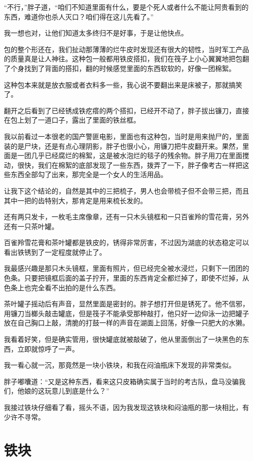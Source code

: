 “不行，”胖子道，“咱们不知道里面有什么，要是个死人或者什么不能让阿贵看到的东西，难道你也杀人灭口？咱们得在这儿先看了。”

我一想也对，让他们知道太多终归不是好事，于是让他快点。

包的整个形还在，我们扯动那薄薄的烂牛皮时发现还有很大的韧性，当时军工产品的质量真是让人神往。这种包一般都用铁皮搭扣，我们在筏子上小心翼翼地把包翻了个身找到了背面的搭扣，翻的时候感觉里面的东西软软的，好像一团棉絮。

这种包本来就是放衣服或者衣料多一些，我心说不要翻出来是床被子，那就搞笑了。

翻开之后看到了已经锈成铁疙瘩的两个搭扣，已经开不动了，胖子拔出镰刀，直接在包上划了一道口子，露出了里面的铁丝框。

我以前看过一本很老的国产警匪电影，里面也有这种包，当时是用来抛尸的，里面装的是尸块，还是有点心理阴影，胖子也很小心，用镰刀把牛皮翻开来。果然，里面是一团几乎已经腐烂的棉絮，这是被水泡烂的毯子的残余物。胖子用刀在里面搅动，很快，我们在棉絮的底部发现了一些东西，拨弄了一下，胖子像考古一样把这些东西全部勾了出来，那完全是一个女人的生活用品。

让我下这个结论的，自然是其中的三把梳子，男人也会带梳子但不会带三把，而且其中一把的齿特别大，那肯定是用来梳长发的。

还有两只发卡，一枚毛主席像章，还有一只木头镜框和一只百雀羚的雪花膏，另外还有一只茶叶罐。

百雀羚雪花膏和茶叶罐都是铁皮的，锈得非常厉害，不过因为湖底的状态稳定可以看出铁锈到了一定程度就停止了。

我最感兴趣是那只木头镜框，里面有照片，但已经完全被水浸烂，只剩下一团团的色条。只要把镜框后面的盖子拧开，里面的东西肯定全都烂掉了，即使不烂掉，从色条上也完全看不出拍的是什么东西。

茶叶罐子摇动后有声音，显然里面是密封的。胖子想打开但是锈死了。他不信邪，用镰刀当榔头敲击罐底，但是筏子不能承受那种敲打，他只好一边仰泳一边把罐子放在自己胸口上敲，清脆的打鼓一样的声音在湖面上回荡，好像一只肥大的水獭。

我看着好笑，但是确实管用，很快罐底就被敲破了，他从里面倒出了一块黑色的东西，立即就惊呼了一声。

我一看心就一沉，那竟然是一块小铁块，和我在闷油瓶床下发现的非常类似。

胖子嘟囔道：“又是这种东西，看来这只皮箱确实属于当时的考古队，盘马没骗我们，他娘的这玩意儿到底是什么？”

我接过铁块仔细看了看，摇头不语，因为我发现这铁块和闷油瓶的那一块相比，有少许不寻常。

\chapter{铁块}

